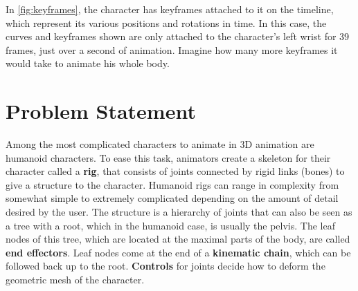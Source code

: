 In \autoref{fig:keyframes}, the character has keyframes attached to it on the timeline, which represent its various positions and rotations in time. In this case, the curves and keyframes shown are only attached to the character's left wrist for 39 frames, just over a second of animation. Imagine how many more keyframes it would take to animate his whole body.

\section{Problem Statement}

Among the most complicated characters to animate in 3D animation are humanoid characters. To ease this task, animators create a skeleton for their character called a \textbf{rig}, that consists of joints connected by rigid links (bones) to give a structure to the character. Humanoid rigs can range in complexity from somewhat simple to extremely complicated depending on the amount of detail desired by the user. The structure is a hierarchy of joints that can also be seen as a tree with a root, which in the humanoid case, is usually the pelvis. The leaf nodes of this tree, which are located at the maximal parts of the body, are called  \textbf{end effectors}. Leaf nodes come at the end of a \textbf{kinematic chain}, which can be followed back up to the root. \textbf{Controls} for joints decide how to deform the geometric mesh of the character.

